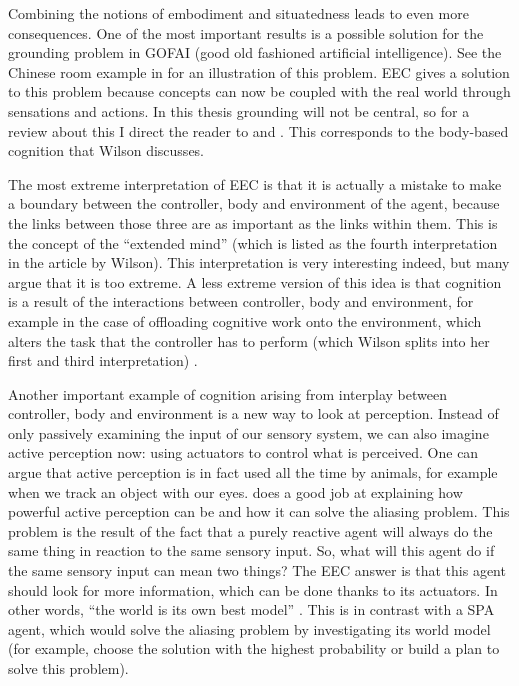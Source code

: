 \documentclass[10pt,a4paper]{report}
\begin{document}
Combining the notions of embodiment and situatedness leads to even more consequences. One of the most important results is a possible solution for the grounding problem in GOFAI (good old fashioned artificial intelligence). See the Chinese room example in \citet{Ziemke2001} for an illustration of this problem. EEC gives a solution to this problem because concepts can now be coupled with the real world through sensations and actions. In this thesis grounding will not be central, so for a review about this I direct the reader to \citet{Barsalou2008} and \citet{Anderson2003}. This corresponds to the body-based cognition that Wilson discusses.

The most extreme interpretation of EEC is that it is actually a mistake to make a boundary between the controller, body and environment of the agent, because the links between those three are as important as the links within them. This is the concept of the ``extended mind'' \citep{Clark1998} (which is listed as the fourth interpretation in the article by Wilson). This interpretation is very interesting indeed, but many argue that it is too extreme. A less extreme version of this idea is that cognition is a result of the interactions between controller, body and environment, for example in the case of offloading cognitive work onto the environment, which alters the task that the controller has to perform (which Wilson splits into her first and third interpretation) \citep{Haselager2008}. 

Another important example of cognition arising from interplay between controller, body and environment is a new way to look at perception. Instead of only passively examining the input of our sensory system, we can also imagine active perception now: using actuators to control what is perceived. One can argue that active perception is in fact used all the time by animals, for example when we track an object with our eyes. \citet{Nolfi2002} does a good job at explaining how powerful active perception can be and how it can solve the aliasing problem. This problem is the result of the fact that a purely reactive agent will always do the same thing in reaction to the same sensory input. So, what will this agent do if the same sensory input can mean two things? The EEC answer is that this agent should look for more information, which can be done thanks to its actuators. In other words, ``the world is its own best model'' \citep{Brooks1991}. This is in contrast with a SPA agent, which would solve the aliasing problem by investigating its world model (for example, choose the solution with the highest probability or build a plan to solve this problem).
\end{document}
